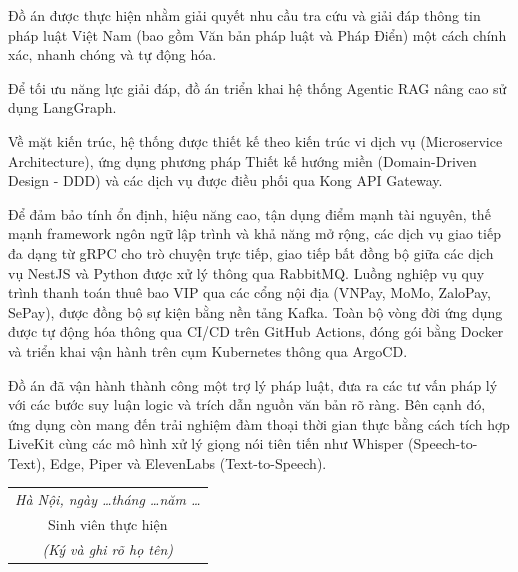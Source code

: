 
Đồ án
được thực hiện nhằm giải quyết nhu cầu tra cứu
và giải đáp thông tin pháp luật Việt Nam
(bao gồm Văn bản pháp luật và Pháp Điển) một cách chính xác, nhanh chóng và tự động hóa.

Để tối ưu năng lực giải đáp,
đồ án triển khai hệ thống
Agentic RAG nâng cao sử dụng LangGraph.

Về mặt kiến trúc, hệ thống được thiết kế theo kiến trúc vi dịch vụ (Microservice Architecture),
ứng dụng phương pháp Thiết kế hướng miền (Domain-Driven Design - DDD)
và các dịch vụ được điều phối qua Kong API Gateway.

Để đảm bảo tính ổn định,
hiệu năng cao,
tận dụng điểm mạnh tài nguyên,
thế mạnh framework ngôn ngữ lập trình
và khả năng mở rộng,
các dịch vụ giao tiếp đa dạng từ gRPC cho trò chuyện trực tiếp,
giao tiếp bất đồng bộ giữa các dịch vụ NestJS và Python
được xử lý thông qua RabbitMQ.
Luồng nghiệp vụ
quy trình thanh toán thuê bao VIP
qua các cổng nội địa (VNPay, MoMo, ZaloPay, SePay),
được đồng bộ
sự kiện
bằng nền tảng Kafka.
Toàn bộ vòng đời ứng dụng
được tự động hóa thông qua
CI/CD trên GitHub Actions,
đóng gói bằng Docker và triển khai vận hành trên
cụm Kubernetes thông qua ArgoCD.

Đồ án đã vận hành thành công một trợ lý pháp luật,
đưa ra các tư vấn pháp lý với các bước suy luận logic
và trích dẫn nguồn văn bản rõ ràng.
Bên cạnh đó,
ứng dụng còn mang đến trải nghiệm đàm thoại
thời gian thực bằng cách tích hợp LiveKit
cùng các mô hình xử lý giọng nói tiên tiến như Whisper (Speech-to-Text), Edge, Piper và ElevenLabs (Text-to-Speech).

\begin{flushright}
\begin{tabular}{c}
\textit{Hà Nội, ngày \dots tháng \dots năm \dots} \\
Sinh viên thực hiện \\
\textit{(Ký và ghi rõ họ tên)} \\
\end{tabular}
\end{flushright}
